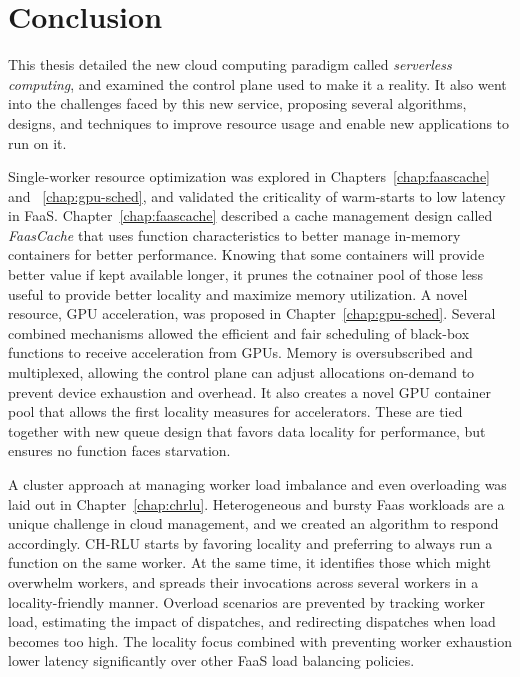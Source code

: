 \section{Conclusion}
\label{sec:conclusion}

This thesis detailed the new cloud computing paradigm called \textit{serverless computing}, and examined the control plane used to make it a reality.
It also went into the challenges faced by this new service, proposing several algorithms, designs, and techniques to improve resource usage and enable new applications to run on it.

Single-worker resource optimization was explored in Chapters~\ref{chap:faascache} and ~\ref{chap:gpu-sched}, and validated the criticality of warm-starts to low latency in FaaS.
Chapter~\ref{chap:faascache} described a cache management design called \emph{FaasCache} that uses function characteristics to better manage in-memory containers for better performance.
Knowing that some containers will provide better value if kept available longer, it prunes the cotnainer pool of those less useful to provide better locality and maximize memory utilization.
A novel resource, GPU acceleration, was proposed in Chapter~\ref{chap:gpu-sched}.
Several combined mechanisms allowed the efficient and fair scheduling of black-box functions to receive acceleration from GPUs.
Memory is oversubscribed and multiplexed, allowing the control plane can adjust allocations on-demand to prevent device exhaustion and overhead.
It also creates a novel GPU container pool that allows the first locality measures for accelerators.
These are tied together with new queue design that favors data locality for performance, but ensures no function faces starvation.

A cluster approach at managing worker load imbalance and even overloading was laid out in Chapter~\ref{chap:chrlu}.
Heterogeneous and bursty Faas workloads are a unique challenge in cloud management, and we created an algorithm to respond accordingly.
CH-RLU starts by favoring locality and preferring to always run a function on the same worker.
At the same time, it identifies those which might overwhelm workers, and spreads their invocations across several workers in a locality-friendly manner.
Overload scenarios are prevented by tracking worker load, estimating the impact of dispatches, and redirecting dispatches when load becomes too high.
The locality focus combined with preventing worker exhaustion lower latency significantly over other FaaS load balancing policies.

